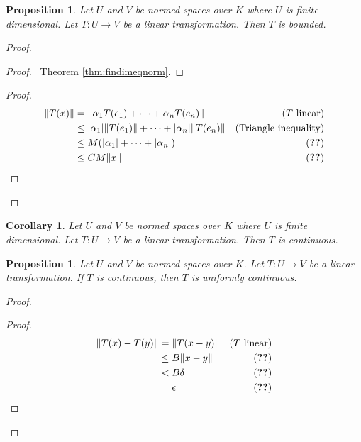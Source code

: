 \documentclass{book}
\let\qed\relax
\newtheorem{prop}[ax]{Proposition}
\newtheorem{cor}{Corollary}[ax]
\theoremstyle{definition}
\begin{document}
\begin{prop}
Let $U$ and $V$ be normed spaces over $K$ where $U$ is finite dimensional. Let $T : U \rightarrow V$ be a linear transformation. Then $T$ is bounded.
\end{prop}

\begin{proof}
\pf
{}
\begin{proof}
	\pf\ Theorem \ref{thm:findimeqnorm}.
\end{proof}
\begin{proof}
	\pf
	\begin{align*}
		\|T(x)\| & = \|\alpha_1 T(e_1) + \cdots + \alpha_n T(e_n)\| & (T \text{ linear}) \\
		& \leq |\alpha_1| \|T(e_1)\| + \cdots + |\alpha_n| \|T(e_n)\| & (\text{Triangle inequality}) \\
		& \leq M(|\alpha_1| + \cdots + |\alpha_n|) & (\text{\stepref{2}}) \\
		& \leq CM\|x\| & (\text{\stepref{3}})
	\end{align*}
\end{proof}
\qed
\end{proof}

\begin{cor}
Let $U$ and $V$ be normed spaces over $K$ where $U$ is finite dimensional. Let $T : U \rightarrow V$ be a linear transformation. Then $T$ is continuous.
\end{cor}

\begin{prop}
Let $U$ and $V$ be normed spaces over $K$. Let $T : U \rightarrow V$ be a linear transformation. If $T$ is continuous, then $T$ is uniformly continuous.
\end{prop}

\begin{proof}
\pf
{}
\begin{proof}
	\pf
	\begin{align*}
		\|T(x) - T(y)\| & = \|T(x-y)\| & (T \text{ linear}) \\
		& \leq B\|x-y\| & (\text{\stepref{2}}) \\
		& < B \delta & (\text{\stepref{5}}) \\
		& = \epsilon & (\text{\stepref{3a}})
	\end{align*}
\end{proof}
\qed
\end{proof}
\end{document}
